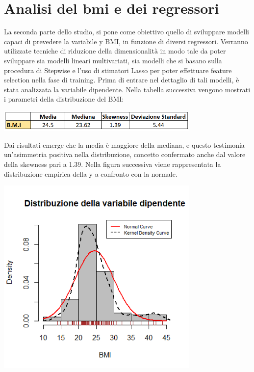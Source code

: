 \section{Analisi del bmi e dei regressori}
La seconda parte dello studio, si pone come obiettivo quello di sviluppare modelli capaci di prevedere la variabile y BMI, in funzione di diversi regressori. Verranno utilizzate tecniche di riduzione della dimensionalità in modo tale da poter sviluppare sia modelli lineari multivariati, sia modelli che si basano sulla procedura di Stepwise e l’uso di stimatori Lasso per poter effettuare feature selection nella fase di training. Prima di entrare nel dettaglio di tali modelli, è stata analizzata la variabile dipendente. Nella tabella successiva vengono mostrati i parametri della distribuzione del BMI:
\vspace*{1cm}
\begin{Figure}
    \centering
    \includegraphics[width=10cm,keepaspectratio]{images/stat_BMI.PNG}
  \end{Figure}
  \vspace*{1cm}
Dai risultati emerge che la media è maggiore della mediana, e questo testimonia un’asimmetria positiva nella distribuzione, concetto confermato anche dal valore della skewness pari a 1.39. Nella figura successiva viene rappresentata la distribuzione empirica della y a confronto con la normale. 
\begin{Figure}
    \centering
    \includegraphics[width=10cm,keepaspectratio]{images/distribuzione_bmi.png}
  \end{Figure}
